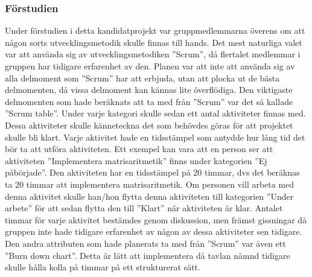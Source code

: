 \subsubsection{Förstudien}
\label{sec:forstudie}
Under förstudien i detta kandidatprojekt var gruppmedlemmarna överens om att någon sorts utvecklingsmetodik skulle finnas till hands. Det mest naturliga valet var att använda sig av utvecklingsmetodiken ''Scrum'', då flertalet medlemmar i gruppen har tidigare erfarenhet av den. 
\newline
\newline
Planen var att inte att använda sig av alla delmoment som ''Scrum'' har att erbjuda, utan att plocka ut de bästa delmomenten, då vissa delmoment kan kännas lite överflödiga. Den viktigaste delmomenten som hade beräknats att ta med från ''Scrum'' var det så kallade ''Scrum table''. Under varje kategori skulle sedan ett antal aktiviteter finnas med. Dessa aktiviteter skulle känneteckna det som behövdes göras för att projektet skulle bli klart. Varje aktivitet hade en tidsstämpel som antydde hur lång tid det bör ta att utföra aktiviteten. Ett exempel kan vara att en person ser att aktiviteten ''Implementera matrisaritmetik'' finns under kategorien ''Ej påbörjade''. Den aktiviteten har en tidsstämpel på 20 timmar, dvs det beräknas ta 20 timmar att implementera matrisaritmetik. Om personen vill arbeta med denna aktivitet skulle han/hon flytta denna aktiviteten till kategorien ''Under arbete'' för att sedan flytta den till ''Klart'' när aktiviteten är klar. Antalet timmar för varje aktivitet bestämdes genom diskussion, men främst gissningar då gruppen inte hade tidigare erfarenhet av någon av dessa aktiviteter sen tidigare.
\newline
\newline
Den andra attributen som hade planerats ta med från ''Scrum'' var även ett ''Burn down chart''. Detta är lätt att implementera då tavlan nämnd tidigare skulle hålla kolla på timmar på ett strukturerat sätt. 
\newline
\newline

